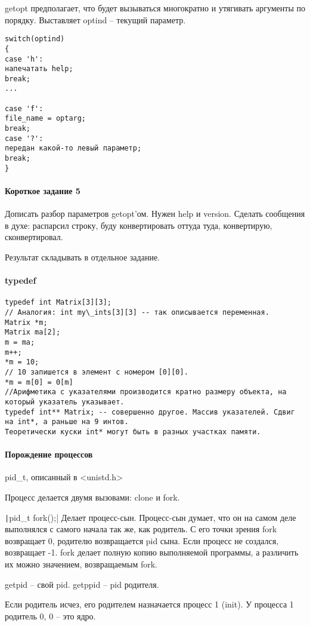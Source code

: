 \documentclass[a4paper,10pt]{article}
\newcommand{\ci}{\texttt}
\begin{document}
getopt предполагает, что будет вызываться многократно и утягивать аргументы по порядку. Выставляет optind -- текущий параметр.

\begin{verbatim}
switch(optind)
{
case 'h':
напечатать help;
break;
...

case 'f':
file_name = optarg;
break;
case '?':
передан какой-то левый параметр;
break;
}
\end{verbatim}
\paragraph{Короткое задание 5}
Дописать разбор параметров getopt'ом. Нужен help и version. Сделать сообщения в духе: распарсил строку, буду конвертировать оттуда туда, конвертирую, сконвертировал.

Результат складывать в отдельное задание.
\paragraph{typedef}
\begin{verbatim}
typedef int Matrix[3][3];
// Аналогия: int my\_ints[3][3] -- так описывается переменная.
Matrix *m;
Matrix ma[2];
m = ma;
m++;
*m = 10;
// 10 запишется в элемент с номером [0][0].
*m = m[0] = 0[m]
//Арифметика с указателями производится кратно размеру объекта, на который указатель указывает.
typedef int** Matrix; -- совершенно другое. Массив указателей. Сдвиг на int*, а раньше на 9 интов.
Теоретически куски int* могут быть в разных участках памяти.
\end{verbatim}
\paragraph{Порождение процессов}
pid\_t, описанный в <unistd.h>

Процесс делается двумя вызовами: clone и fork.

\ci|pid_t fork();|
Делает процесс-сын. Процесс-сын думает, что он на самом деле выполнялся с самого начала так же, как родитель. С его точки зрения fork возвращает 0, родителю возвращается pid сына. Если процесс не создался, возвращает -1.
fork делает полную копию выполняемой программы, а различить их можно значением, возвращаемым fork.

getpid -- свой pid. getppid -- pid родителя.

Если родитель исчез, его родителем назначается процесс 1 (init). У процесса 1 родитель 0, 0 -- это ядро.
\end{document}

